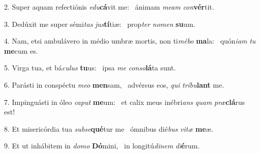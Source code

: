 2. Super aquam refectiónis \textit{e}\textit{du}\textbf{cá}vit me: \ast\  ánimam \textit{me}\textit{am} \textit{con}\textbf{vér}tit.\

3. Dedúxit me super sémi\textit{tas} \textit{jus}\textbf{tí}tiæ: \ast\  prop\textit{ter} \textit{no}\textit{men} \textbf{su}um.\

4. Nam, etsi ambulávero in médio umbræ mortis, non ti\textit{mé}\textit{bo} \textbf{ma}la: \ast\  quón\textit{i}\textit{am} \textit{tu} \textbf{me}cum es.\

5. Virga tua, et bá\textit{cu}\textit{lus} \textbf{tu}us: \ast\  ipsa \textit{me} \textit{con}\textit{so}\textbf{lá}ta sunt.\

6. Parásti in conspéctu \textit{me}\textit{o} \textbf{men}sam, \ast\  advérsus eos, \textit{qui} \textit{trí}\textit{bu}\textbf{lant} me.\

7. Impinguásti in óleo \textit{ca}\textit{put} \textbf{me}um: \ast\  et calix meus inébri\textit{ans} \textit{quam} \textit{præ}\textbf{clá}rus est!\

8. Et misericórdia tua \textit{sub}\textit{se}\textbf{qué}tur me \ast\  ómnibus dié\textit{bus} \textit{vi}\textit{tæ} \textbf{me}æ.\

9. Et ut inhábitem in \textit{do}\textit{mo} \textbf{Dó}mini, \ast\  in longitú\textit{di}\textit{nem} \textit{di}\textbf{é}rum.\

